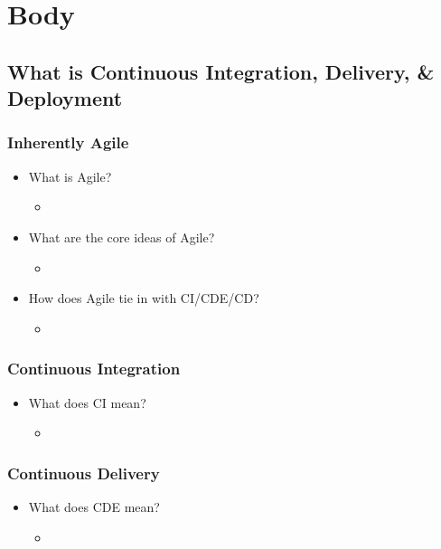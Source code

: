 \documentclass[11pt,a4paper]{article}
\begin{document}
\section{Body}
	\subsection{What is Continuous Integration, Delivery, \& Deployment}
		\subsubsection{Inherently Agile}
		\begin{itemize}[noitemsep]
			\item What is Agile?
			\begin{itemize}
				\item
			\end{itemize}
			\item What are the core ideas of Agile?
			\begin{itemize}
				\item
			\end{itemize}
			\item How does Agile tie in with CI/CDE/CD?
			\begin{itemize}
				\item
			\end{itemize}
		\end{itemize}
		\vspace{-7mm}
		\subsubsection{Continuous Integration}
		\begin{itemize}[noitemsep]
			\item What does CI mean?
			\begin{itemize}
				\item
			\end{itemize}
		\end{itemize}
		\subsubsection{Continuous Delivery}
		\begin{itemize}[noitemsep]
			\item What does CDE mean?
			\begin{itemize}
				\item
			\end{itemize}
		\end{itemize}
\end{document}

